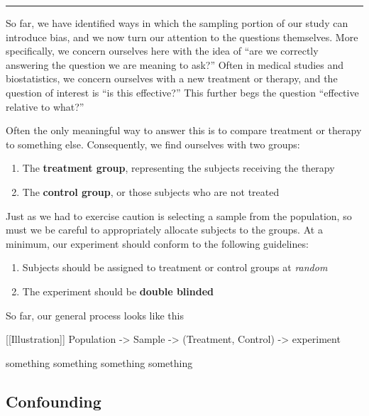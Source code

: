 \documentclass[
]{book}
\providecommand{\tightlist}{%
  \setlength{\itemsep}{0pt}\setlength{\parskip}{0pt}}
\theoremstyle{definition}
\theoremstyle{definition}
\theoremstyle{definition}
\theoremstyle{remark}
\begin{document}
\begin{center}\rule{0.5\linewidth}{0.5pt}\end{center}

So far, we have identified ways in which the sampling portion of our study can introduce bias, and we now turn our attention to the questions themselves. More specifically, we concern ourselves here with the idea of ``are we correctly answering the question we are meaning to ask?'' Often in medical studies and biostatistics, we concern ourselves with a new treatment or therapy, and the question of interest is ``is this effective?'' This further begs the question ``effective relative to what?''

Often the only meaningful way to answer this is to compare treatment or therapy to something else. Consequently, we find ourselves with two groups:

\begin{enumerate}
\def\labelenumi{\arabic{enumi}.}
\tightlist
\item
  The \textbf{treatment group}, representing the subjects receiving the therapy
\item
  The \textbf{control group}, or those subjects who are not treated
\end{enumerate}

Just as we had to exercise caution is selecting a sample from the population, so must we be careful to appropriately allocate subjects to the groups. At a minimum, our experiment should conform to the following guidelines:

\begin{enumerate}
\def\labelenumi{\arabic{enumi}.}
\tightlist
\item
  Subjects should be assigned to treatment or control groups at \emph{random}
\item
  The experiment should be \textbf{double blinded}
\end{enumerate}

So far, our general process looks like this

{[}{[}Illustration{]}{]} Population -\textgreater{} Sample -\textgreater{} (Treatment, Control) -\textgreater{} experiment

something something something something

\hypertarget{confounding}{%
\subsection{Confounding}\label{confounding}}
\end{document}
